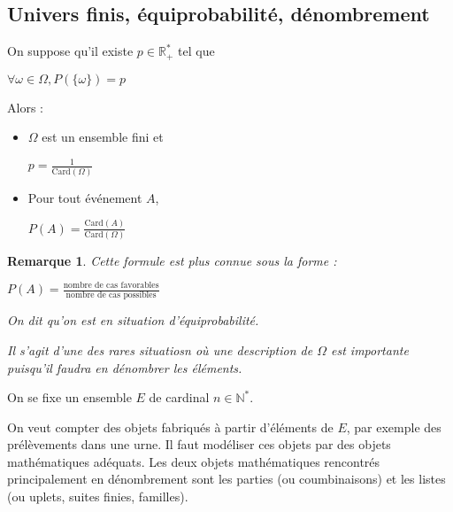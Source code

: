\documentclass[a4paper,12pt]{book}
\newcommand{\Prop}[2]{\begin{tcolorbox}[sharp corners, colback=white,colframe=red!90!black!75, title=Proposition : #1]#2\end{tcolorbox}}
\newtheorem{Rem}{Remarque}[section]
\def\R{\mathbb{R}}
\def\N{\mathbb{N}}
\begin{document}
\subsection{Univers finis, équiprobabilité, dénombrement}
\Prop{}{On suppose qu'il existe $p\in\R_+^*$ tel que \par\begin{center}$\forall \omega\in \Omega, P(\{\omega\})=p$\end{center}
\par Alors :\begin{itemize}
\item $\Omega$ est un ensemble fini et \par\begin{center}$p=\frac{1}{\mathrm{Card}(\Omega)}$\end{center}
\item Pour tout événement $A$, \par\begin{center}$P(A)=\frac{\mathrm{Card}(A)}{\mathrm{Card}(\Omega)}$\end{center}
\end{itemize}}
\begin{Rem}
Cette formule est plus connue sous la forme : \par\begin{center}$P(A)=\frac{\text{nombre de cas favorables}}{\text{nombre de cas possibles}}$\end{center}
\par On dit qu'on est en situation d'équiprobabilité.
\par Il s'agit d'une des rares situatiosn où une description de $\Omega$ est importante puisqu'il faudra en dénombrer les éléments.
\end{Rem}
On se fixe un ensemble $E$ de cardinal $n\in\N^*$.
\par On veut compter des objets fabriqués à partir d'éléments de $E$, par exemple des prélèvements dans une urne. Il faut modéliser ces objets par des objets mathématiques adéquats. Les deux objets mathématiques rencontrés principalement en dénombrement sont les parties (ou coumbinaisons) et les listes (ou uplets, suites finies, familles).
\end{document}
